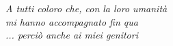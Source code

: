 {
\thispagestyle{empty}


\vspace*{3cm}
\hskip5cm\parbox[t]{10cm}
{\large 
\textit{A tutti coloro che, con la loro umanit\`a \\
 mi hanno accompagnato fin qua\\
 ... perci\`o anche ai miei genitori }
}

%

\newpage
\newpage
\thispagestyle{empty}
\clearpage
}

